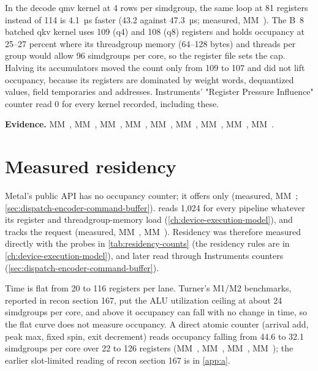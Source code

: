 In the decode qmv kernel at 4 rows per simdgroup, the same loop at 81 registers instead of 114 is 4.1~µs faster
(43.2 against 47.3~µs; measured, MM~). The B~8 batched qkv kernel uses 109 (q4)
and 108 (q8) registers and holds occupancy at 25–27 percent where its threadgroup memory (64–128 bytes) and
threads per group would allow 96 simdgroups per core, so the register file sets the cap. Halving its accumulators moved the
count only from 109 to 107 and did not lift occupancy, because its registers are dominated by weight words, dequantized values,
field temporaries and addresses. Instruments' "Register Pressure Influence" counter read 0 for every kernel recorded,
including these.

\textbf{Evidence.} MM~, MM~, MM~, MM~, MM~, MM~, MM~, MM~, MM~.

\section{Measured residency}\label{sec:residency-occupancy-measurements}

Metal's public API has no occupancy counter; it offers only  (measured, MM~; \cref{sec:dispatch-encoder-command-buffer}).
 reads 1,024 for every pipeline whatever its register and threadgroup-memory
load (\cref{ch:device-execution-model}), and  tracks the request (measured,
MM~, MM~). Residency was therefore measured
directly with the probes in \cref{tab:residency-counts} (the residency rules are in \cref{ch:device-execution-model}),
and later read through Instruments counters (\cref{sec:dispatch-encoder-command-buffer}).

Time is flat from 20 to 116 registers per lane. Turner's M1/M2 benchmarks, reported in recon section 167, put the ALU
utilization ceiling at about 24 simdgroups per core, and above it occupancy can fall with no change in time, so the
flat curve does not measure occupancy. A direct atomic counter (arrival add, peak max, fixed spin, exit decrement) reads occupancy falling from 44.6
to 32.1 simdgroups per core over 22 to 126 registers (MM~, MM~, MM~, MM~); the
earlier slot-limited reading of recon section 167 is in \cref{app:a}.

